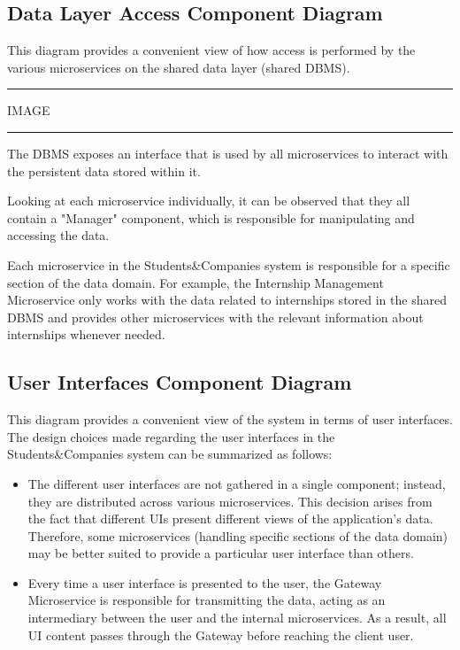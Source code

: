 \subsection{Data Layer Access Component Diagram}

This diagram provides a convenient view of how access is performed by the various microservices on the shared data layer (shared DBMS).

\vspace{20pt}
\hrule
\vspace{10pt}
IMAGE
\vspace{10pt}
\hrule
\vspace{20pt}

The DBMS exposes an interface that is used by all microservices to interact with the persistent data stored within it.

Looking at each microservice individually, it can be observed that they all contain a "Manager" component, which is responsible for manipulating and accessing the data.

Each microservice in the Students\&Companies system is responsible for a specific section of the data domain. For example, the Internship Management Microservice only works with the data related to internships stored in the shared DBMS and provides other microservices with the relevant information about internships whenever needed.

\subsection{User Interfaces Component Diagram}

This diagram provides a convenient view of the system in terms of user interfaces. The design choices made regarding the user interfaces in the Students\&Companies system can be summarized as follows:

\begin{itemize}
    \item The different user interfaces are not gathered in a single component; instead, they are distributed across various microservices. This decision arises from the fact that different UIs present different views of the application’s data. Therefore, some microservices (handling specific sections of the data domain) may be better suited to provide a particular user interface than others.
    \item Every time a user interface is presented to the user, the Gateway Microservice is responsible for transmitting the data, acting as an intermediary between the user and the internal microservices. As a result, all UI content passes through the Gateway before reaching the client user.
\end{itemize}


